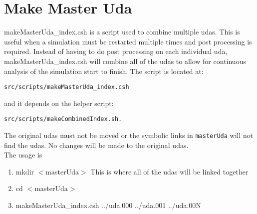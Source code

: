 \section{Make Master Uda}
makeMasterUda\_index.csh is a script used to combine multiple udas. This is useful when a simulation must be restarted multiple times and post processing is required. Instead of having to do post processing on each individual uda, makeMasterUda\_index.csh will combine all of the udas to allow for continuous analysis of the simulation start to finish.  The script is located at:
%
\begin{Verbatim}[fontsize=\footnotesize] 
    src/scripts/makeMasterUda_index.csh 
\end{Verbatim} 
%
 and it depends on the helper script: 
%
\begin{Verbatim}[fontsize=\footnotesize] 
    src/scripts/makeCombinedIndex.sh.
\end{Verbatim} 
%
The original udas must not be moved or the symbolic links in \verb|masterUda| will not find the udas. No changes will be made to the original udas.
\\
The usage is 
\begin{enumerate}
  \item mkdir $<$masterUda$>$ This is where all of the udas will be linked together
  \item cd $<$masterUda$>$
  \item makeMasterUda\_index.csh ../uda.000 ../uda.001 ../uda.00N
\end{enumerate}

